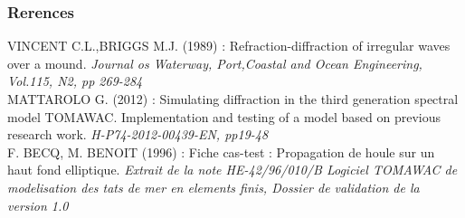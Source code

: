\subsubsection*{Rerences}

 VINCENT C.L.,BRIGGS M.J. (1989) : Refraction-diffraction of irregular waves over a mound. \textit{Journal os Waterway, Port,Coastal and Ocean Engineering, Vol.115, N2, pp 269-284}\\
 MATTAROLO G. (2012) : Simulating diffraction in the third generation spectral model TOMAWAC. Implementation and testing of a model based on previous research work. \textit{H-P74-2012-00439-EN, pp19-48}\\
 F. BECQ, M. BENOIT (1996) : Fiche cas-test : Propagation de houle sur un haut fond elliptique. \textit{Extrait de la note HE-42/96/010/B Logiciel TOMAWAC de modelisation des tats de mer en elements finis, Dossier de validation de la version 1.0} 

